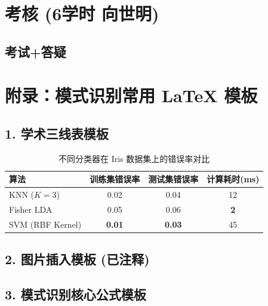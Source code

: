 \documentclass[a4paper, 11pt]{ctexart}
\begin{document}
\newpage
\section{考核 \small{(6学时 向世明)}}
\subsection{考试+答疑}

\newpage
\appendix
\section*{附录：模式识别常用 LaTeX 模板}

\subsection*{1. 学术三线表模板}
\begin{table}[H]
    \centering
    \caption{不同分类器在 Iris 数据集上的错误率对比}
    \label{tab:pr_error}
    \begin{tabular}{lccc} 
        \toprule
        \textbf{算法} & \textbf{训练集错误率} & \textbf{测试集错误率} & \textbf{计算耗时(ms)} \\
        \midrule
        KNN ($K=3$) & 0.02 & 0.04 & 12 \\
        Fisher LDA & 0.05 & 0.06 & \textbf{2} \\
        SVM (RBF Kernel) & \textbf{0.01} & \textbf{0.03} & 45 \\
        \bottomrule
    \end{tabular}
\end{table}

\subsection*{2. 图片插入模板 (已注释)}

\subsection*{3. 模式识别核心公式模板}
\end{document}
